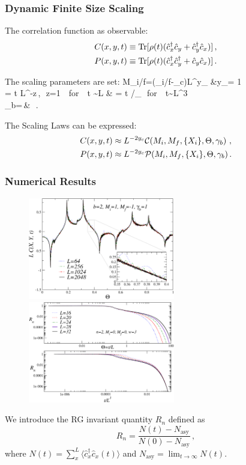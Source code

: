 \begin{frame}
	\frametitle{Dynamic Finite Size Scaling}
	The correlation function as observable:
	\begin{align}
        C(x, y, t)&\equiv{\rm Tr}[\rho(t)(\hat{c}^\dagger_x\hat{c}_y+\hat{c}^\dagger_y\hat{c}_x)]\,,\\
        P(x, y, t)&\equiv{\rm Tr}[\rho(t)(\hat{c}^\dagger_x\hat{c}^\dagger_y+\hat{c}_y\hat{c}_x)]\,.
    \label{eq_def_two_point_functions_C_P}
	\end{align}


	The scaling parameters are set:
	\ba{}
	M_{i/f}=(\mu_{i/f}-\mu_c)L^{y_\mu} &\qquad y_\mu = 1 \pc \\
	\Theta = t L^{-z}\,,\,\, z=1 \,\, 
	{\rm for} \,\, t \sim L &\pc \qquad
	\Theta = t /\Delta_\lambda \,\, 
	{\rm for} \,\, t\sim L^3 \pc \\
	\gamma_b=\,& \,\,.
	\ea


	The Scaling Laws can be expressed:
	\begin{align}
    C(x, y, t) &\approx L^{-2y_c}\mathcal{C}(M_i, M_f, \{X_i\}, \Theta, \gamma_b) \,\, ,   \notag \\
    P(x, y, t) &\approx L^{-2y_c}\mathcal{P}(M_i, M_f, \{X_i\}, \Theta, \gamma_b)\,.\notag
\end{align}

\end{frame}

\begin{frame}
	\frametitle{Numerical Results}
	\begin{figure}
    \centering
    \includegraphics[width=6.4cm]{imm/Cscaling2b.pdf}
    \includegraphics[width=6.4cm]{imm/fss_and_gap_n_fixed.pdf}
    \label{fig_Cscaling2b}
\end{figure}
We introduce the RG invariant quantity $R_n$ defined as 
\begin{equation}
    R_n = \frac{N(t) - N_{\text{asy}}}{N(0) - N_{\text{asy}}}\,,
    \label{def_Rn}
\end{equation}
where $N(t)=\sum_x^L\langle\hat c^\dagger_x \hat c_x(t)\rangle$
and $N_{\text{asy}}=\lim_{t\to\infty}N(t)$. 

\end{frame}
